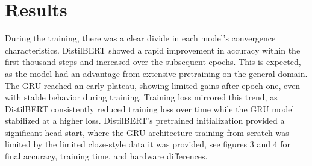 \documentclass[11pt]{article}
\begin{document}
    \section{Results}\label{results}

\begin{samepage}
    During the training, there was a clear divide in each model's
convergence characteristics. DistilBERT showed a rapid improvement in
accuracy within the first thousand steps and increased over the
subsequent epochs. This is expected, as the model had an advantage from
extensive pretraining on the general domain. The GRU reached an early
plateau, showing limited gains after epoch one, even with stable
behavior during training. Training loss mirrored this trend, as
DistilBERT consistently reduced training loss over time while the GRU
model stabilized at a higher loss. DistilBERT's pretrained
initialization provided a significant head start, where the GRU
architecture training from scratch was limited by the limited
cloze-style data it was provided, see figures 3 and 4 for final
accuracy, training time, and hardware differences.
\end{samepage}
\newline{}
\end{document}
